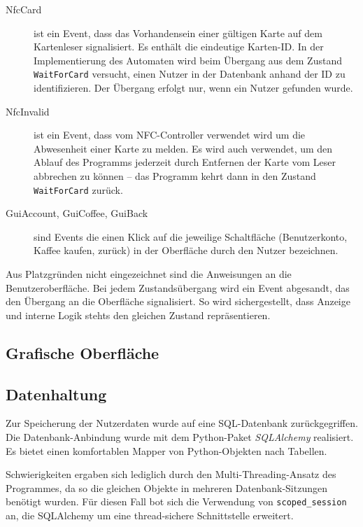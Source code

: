 \documentclass[11pt,a4paper]{IEEEtran} \usepackage[ngerman]{babel}
\begin{document}
\begin{description}
    \item[NfcCard] ist ein Event, dass das Vorhandensein einer gültigen
        Karte auf dem Kartenleser signalisiert. Es enthält die eindeutige 
        Karten-ID. In der Implementierung des Automaten wird beim Übergang aus
        dem Zustand \texttt{WaitForCard} versucht, einen Nutzer in der
        Datenbank anhand der ID zu identifizieren. Der Übergang erfolgt nur,
        wenn ein Nutzer gefunden wurde.
    \item[NfcInvalid] ist ein Event, dass vom NFC-Controller verwendet wird
        um die Abwesenheit einer Karte zu melden. Es wird auch verwendet, um 
        den Ablauf des Programms jederzeit durch Entfernen der Karte vom Leser
        abbrechen zu können -- das Programm kehrt dann in den Zustand
        \texttt{WaitForCard} zurück.
    \item[GuiAccount, GuiCoffee, GuiBack] sind Events die einen Klick auf die
        jeweilige Schaltfläche (Benutzerkonto, Kaffee kaufen, zurück) in der 
        Oberfläche durch den Nutzer bezeichnen.
\end{description}

Aus Platzgründen nicht eingezeichnet sind die Anweisungen an die
Benutzeroberfläche. Bei jedem Zustandsübergang wird ein Event abgesandt, das 
den Übergang an die Oberfläche signalisiert. So wird sichergestellt, dass
Anzeige und interne Logik stehts den gleichen Zustand repräsentieren.

\subsection{Grafische Oberfläche} 
\label{sec:gui}

\subsection{Datenhaltung}

Zur Speicherung der Nutzerdaten wurde auf eine SQL-Datenbank zurückgegriffen.
Die Datenbank-Anbindung wurde mit dem Python-Paket
\emph{SQLAlchemy}\autocite{SQLAlchemy} realisiert. Es bietet einen komfortablen
Mapper von Python-Objekten nach Tabellen. 

Schwierigkeiten ergaben sich lediglich durch den Multi-Threading-Ansatz des 
Programmes, da so die gleichen Objekte in mehreren Datenbank-Sitzungen benötigt
wurden. Für diesen Fall bot sich die Verwendung von \texttt{scoped\_session}
an, die SQLAlchemy um eine thread-sichere Schnittstelle erweitert.
\end{document}
